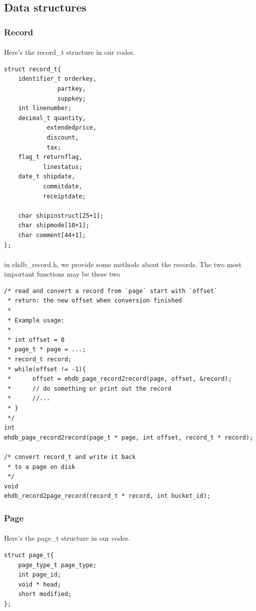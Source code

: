 \documentclass{article}
\begin{document}
    \subsection{Data structures}
        \subsubsection{Record}
            \paragraph{}
                Here's the record\_t structure in our codes.
\begin{verbatim}
struct record_t{
    identifier_t orderkey, 
               partkey, 
               suppkey;
    int linenumber;
    decimal_t quantity,
            extendedprice,
            discount,
            tax;
    flag_t returnflag,
           linestatus;
    date_t shipdate,
           commitdate,
           receiptdate;

    char shipinstruct[25+1];
    char shipmode[10+1];
    char comment[44+1];
};
\end{verbatim}
            \paragraph{}
                in ehdb\_record.h, we provide some methods about the records. The two most important functions may be these two
\begin{verbatim}
/* read and convert a record from `page` start with `offset`
 * return: the new offset when conversion finished
 *
 * Example usage:
 *
 * int offset = 0
 * page_t * page = ...;
 * record_t record;
 * while(offset != -1){
 *      offset = ehdb_page_record2record(page, offset, &record);
 *      // do something or print out the record
 *      //...
 * }
 */
int 
ehdb_page_record2record(page_t * page, int offset, record_t * record);

/* convert record_t and write it back
 * to a page on disk
 */
void 
ehdb_record2page_record(record_t * record, int bucket_id);
\end{verbatim}
        \subsubsection{Page}
            \paragraph{}
                Here's the page\_t structure in our codes.
\begin{verbatim}
struct page_t{
    page_type_t page_type;
    int page_id;
    void * head;
    short modified;
};
\end{verbatim}
\end{document}
